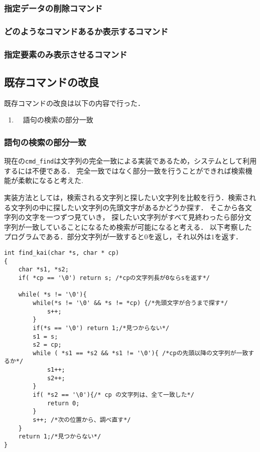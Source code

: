 \documentclass[a4j,11pt]{jarticle}
\begin{document}
\subsubsection{指定データの削除コマンド}\label{sec:sakujyo}
\subsubsection{どのようなコマンドあるか表示するコマンド}\label{sec:help}
\subsubsection{指定要素のみ表示させるコマンド}\label{sec:printyouso}
\subsection{既存コマンドの改良}\label{sec:kison}
既存コマンドの改良は以下の内容で行った．
\begin{enumerate}
\setlength{\parskip}{2pt} \setlength{\itemsep}{2pt}
    \item　語句の検索の部分一致
\end{enumerate}
\subsubsection{語句の検索の部分一致}
現在の\verb|cmd_find|は文字列の完全一致による実装であるため，システムとして利用するには不便である．
完全一致ではなく部分一致を行うことができれば検索機能が柔軟になると考えた.

実装方法としては，検索される文字列と探したい文字列を比較を行う．検索される文字列の中に探したい文字列の先頭文字があるかどうか探す．
そこから各文字列の文字を一つずつ見ていき，
探したい文字列がすべて見終わったら部分文字列が一致していることになるため検索が可能になると考える．
以下考察したプログラムである．部分文字列が一致すると$0$を返し，それ以外は$1$を返す．
\begin{verbatim}
int find_kai(char *s, char * cp)
{
	char *s1, *s2;
	if( *cp == '\0') return s; /*cpの文字列長が0ならsを返す*/ 

	while( *s != '\0'){
		while(*s != '\0' && *s != *cp) {/*先頭文字が合うまで探す*/
			s++;
		}
		if(*s == '\0') return 1;/*見つからない*/
		s1 = s;
		s2 = cp;
		while ( *s1 == *s2 && *s1 != '\0'){ /*cpの先頭以降の文字列が一致するか*/
			s1++;
			s2++;
		}
		if( *s2 == '\0'){/* cp の文字列は、全て一致した*/
			return 0;
		}
		s++; /*次の位置から、調べ直す*/
	}
	return 1;/*見つからない*/
}
\end{verbatim}
\end{document}
